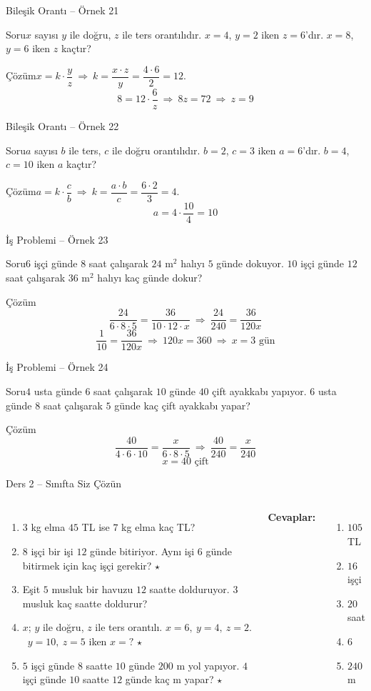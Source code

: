 \documentclass[aspectratio=169,11pt,handout]{beamer}
\newcommand{\soru}[3]{%
\begin{frame}{#1}
  \begin{block}{Soru}\large #2\end{block}
  \pause
  \begin{exampleblock}{Çözüm}\large #3\end{exampleblock}
\end{frame}}
\begin{document}
\soru{Bileşik Orantı -- Örnek 21}
{\(x\) sayısı \(y\) ile doğru, \(z\) ile ters orantılıdır. \(x=4\), \(y=2\) iken \(z=6\)'dır. \(x=8\), \(y=6\) iken \(z\) kaçtır?}
{\(x=k\cdot\dfrac{y}{z}\ \Rightarrow\ k=\dfrac{x\cdot z}{y}=\dfrac{4\cdot 6}{2}=12\).
\[8=12\cdot\frac{6}{z}\ \Rightarrow\ 8z=72\ \Rightarrow\ z=9\]}

\soru{Bileşik Orantı -- Örnek 22}
{\(a\) sayısı \(b\) ile ters, \(c\) ile doğru orantılıdır. \(b=2\), \(c=3\) iken \(a=6\)'dır. \(b=4\), \(c=10\) iken \(a\) kaçtır?}
{\(a=k\cdot\dfrac{c}{b}\ \Rightarrow\ k=\dfrac{a\cdot b}{c}=\dfrac{6\cdot 2}{3}=4\).
\[a=4\cdot\frac{10}{4}=10\]}

\soru{İş Problemi -- Örnek 23}
{\(6\) işçi günde \(8\) saat çalışarak \(24\) m\(^2\) halıyı \(5\) günde dokuyor. \(10\) işçi günde \(12\) saat çalışarak \(36\) m\(^2\) halıyı kaç günde dokur?}
{\[\frac{24}{6\cdot 8\cdot 5}=\frac{36}{10\cdot 12\cdot x}\ \Rightarrow\ \frac{24}{240}=\frac{36}{120x}\]
\[\frac{1}{10}=\frac{36}{120x}\ \Rightarrow\ 120x=360\ \Rightarrow\ x=3\text{ gün}\]}

\soru{İş Problemi -- Örnek 24}
{\(4\) usta günde \(6\) saat çalışarak \(10\) günde \(40\) çift ayakkabı yapıyor. \(6\) usta günde \(8\) saat çalışarak \(5\) günde kaç çift ayakkabı yapar?}
{\[\frac{40}{4\cdot 6\cdot 10}=\frac{x}{6\cdot 8\cdot 5}\ \Rightarrow\ \frac{40}{240}=\frac{x}{240}\]
\[x=40\text{ çift}\]}

\begin{frame}{Ders 2 -- Sınıfta Siz Çözün}
\begin{columns}[t]
\begin{enumerate}
\item \(3\) kg elma \(45\) TL ise \(7\) kg elma kaç TL?
\item \(8\) işçi bir işi \(12\) günde bitiriyor. Aynı işi \(6\) günde bitirmek için kaç işçi gerekir? \(\star\)
\item Eşit \(5\) musluk bir havuzu \(12\) saatte dolduruyor. \(3\) musluk kaç saatte doldurur?
\item \(x\); \(y\) ile doğru, \(z\) ile ters orantılı. \(x=6,\ y=4,\ z=2\). \ \(y=10,\ z=5\) iken \(x=?\) \(\star\)
\item \(5\) işçi günde \(8\) saatte \(10\) günde \(200\) m yol yapıyor. \(4\) işçi günde \(10\) saatte \(12\) günde kaç m yapar? \(\star\)
\end{enumerate}
\pause
\textbf{Cevaplar:}
\begin{enumerate}
\item \(105\) TL
\item \(16\) işçi
\item \(20\) saat
\item \(6\)
\item \(240\) m
\end{enumerate}
\end{columns}
\vspace{4pt}{\footnotesize \(\star\) işaretli soruların adım adım çözümü sonraki slaytlardadır.}
\end{frame}
\end{document}
